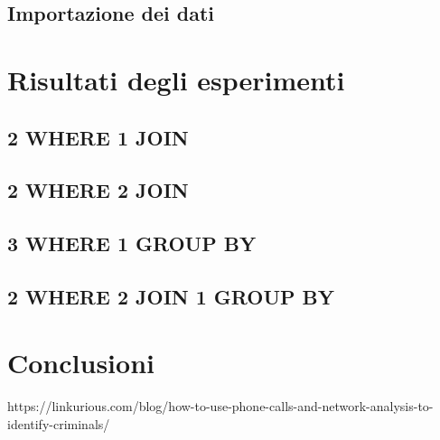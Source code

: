     \pagebreak
    \subsection{Importazione dei dati}


\pagebreak
\section{Risultati degli esperimenti}

    \pagebreak
    \subsection{2 WHERE 1 JOIN}

    \pagebreak
    \subsection{2 WHERE 2 JOIN}

    \pagebreak
    \subsection{3 WHERE 1 GROUP BY}

    \pagebreak
    \subsection{2 WHERE 2 JOIN 1 GROUP BY}


\pagebreak
\section{Conclusioni}

\begin{thebibliography}{1}
 https://linkurious.com/blog/how-to-use-phone-calls-and-network-analysis-to-identify-criminals/
\end{thebibliography}

